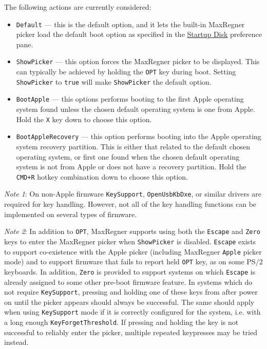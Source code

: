 \documentclass[]{article}
\providecommand{\tightlist}{%
  \setlength{\itemsep}{0pt}\setlength{\parskip}{0pt}}
\begin{document}
\begin{enumerate}
  The following actions are currently considered:

  \begin{itemize}
  \tightlist
  \item \texttt{Default} --- this is the default option, and it lets the built-in MaxRegner
  picker load the default boot option as specified in the
  \href{https://support.apple.com/HT202796}{Startup Disk} preference pane.
  \item \texttt{ShowPicker} --- this option forces the MaxRegner picker to be displayed. This can
  typically be achieved by holding the \texttt{OPT} key during boot. Setting \texttt{ShowPicker} to
  \texttt{true} will make \texttt{ShowPicker} the default option.
  \item \texttt{BootApple} --- this options performs booting to the first Apple
  operating system found unless the chosen default operating system is one from Apple.
  Hold the \texttt{X} key down to choose this option.
  \item \texttt{BootAppleRecovery} --- this option performs booting into the Apple operating
  system recovery partition. This is either that related to the default chosen operating system,
  or first one found when the chosen default operating system is not from Apple or does not have
  a recovery partition. Hold the \texttt{CMD+R} hotkey combination down to choose this option.
  \end{itemize}

  \emph{Note 1}: On non-Apple firmware \texttt{KeySupport}, \texttt{OpenUsbKbDxe}, or similar drivers are
  required for key handling. However, not all of the key handling functions can be implemented on several
  types of firmware.

  \emph{Note 2}: In addition to \texttt{OPT}, MaxRegner supports using both the \texttt{Escape}
  and \texttt{Zero} keys to enter the MaxRegner picker when \texttt{ShowPicker} is disabled.
  \texttt{Escape} exists to support co-existence with the Apple picker (including MaxRegner \texttt{Apple}
  picker mode) and to support firmware that fails to report held \texttt{OPT} key, as on some PS/2 keyboards.
  In addition, \texttt{Zero} is provided to support systems on which \texttt{Escape} is already assigned to
  some other pre-boot firmware feature. In systems which do not require \texttt{KeySupport}, pressing and
  holding one of these keys from after power on until the picker appears should always be successful. The
  same should apply when using \texttt{KeySupport} mode if it is correctly configured for the system, i.e.
  with a long enough \texttt{KeyForgetThreshold}. If pressing and holding the key is not successful to reliably
  enter the picker, multiple repeated keypresses may be tried instead.


\end{enumerate}
\end{document}

